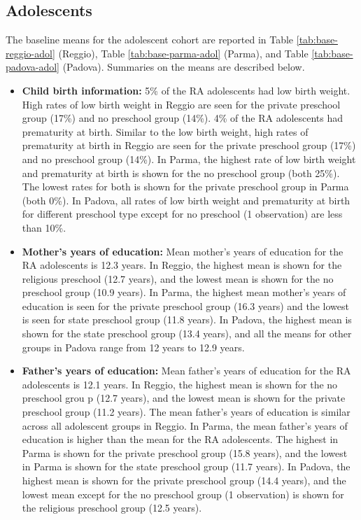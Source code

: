 \documentclass[12pt]{article}
\begin{document}
\subsection{Adolescents}

The baseline means for the adolescent cohort are reported in Table \ref{tab:base-reggio-adol} (Reggio), Table \ref{tab:base-parma-adol} (Parma), and Table \ref{tab:base-padova-adol} (Padova). Summaries on the means are described below.

\begin{itemize}
\item \textbf{Child birth information:} 5\% of the RA adolescents had low birth weight. High rates of low birth weight in Reggio are seen for the private preschool group (17\%) and no preschool group (14\%). 4\% of the RA adolescents had prematurity at birth. Similar to the low birth weight, high rates of prematurity at birth in Reggio are seen for the private preschool group (17\%) and no preschool group (14\%). In Parma, the highest rate of low birth weight and prematurity at birth is shown for the no preschool group (both 25\%). The lowest rates for both is shown for the private preschool group in Parma (both 0\%). In Padova, all rates of low birth weight and prematurity at birth for different preschool type except for no preschool (1 observation) are less than 10\%.

\item \textbf{Mother's years of education:} Mean mother's years of education for the RA adolescents is 12.3 years. In Reggio, the highest mean is shown for the religious preschool (12.7 years), and the lowest mean is shown for the no preschool group (10.9 years). In Parma, the highest mean mother's years of education is seen for the private preschool group (16.3 years) and the lowest is seen for state preschool group (11.8 years). In Padova, the highest mean is shown for the state preschool group (13.4 years), and all the means for other groups in Padova range from 12 years to 12.9 years.

\item \textbf{Father's years of education:} Mean father's years of education for the RA adolescents is 12.1 years. In Reggio, the highest mean is shown for the no preschool grou p (12.7 years), and the lowest mean is shown for the private preschool group (11.2 years). The mean father's years of education is similar across all adolescent groups in Reggio. In Parma, the mean father's years of education is higher than the mean for the RA adolescents. The highest in Parma is shown for the private preschool group (15.8 years), and the lowest in Parma is shown for the state preschool group (11.7 years). In Padova, the highest mean is shown for the private preschool group (14.4 years), and the lowest mean except for the no preschool group (1 observation) is shown for the religious preschool group (12.5 years).


\end{itemize}
\end{document}

